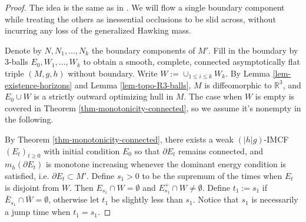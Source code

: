 \documentclass[11pt, letterpaper]{amsart}
\theoremstyle{definition}
\theoremstyle{remark}
\begin{document}
\begin{proof}
	The idea is the same as in \cite[Section 6]{HI01}. We will flow a single boundary component while treating the others as inessential occlusions to be slid across, without incurring any loss of the generalized Hawking mass. 

	Denote by $N, N_1, \ldots, N_{k}$ the boundary components of $M'$. Fill in the boundary by $3$-balls $E_0, W_1, \ldots, W_k$ to obtain a smooth, complete, connected asymptotically flat triple $(M, g, h)$ without boundary. Write $W:= \cup _{1 \leq i \leq k} W_k$. By Lemma \ref{lem-existence-horizons} and Lemma \ref{lem-topo-R3-balls}, $M$ is diffeomorphic to $\mathbb{R}^{3}$, and $E_0 \cup W$ is a strictly outward optimizing hull in $M$. The case when $W$ is empty is covered in Theorem \ref{thm-monotonicity-connected}, so we assume it's nonempty in the following.

	By Theorem \ref{thm-monotonicity-connected}, there exists a weak $(|h|g)$-IMCF $(E_t)_{t \geq 0}$ with initial condition $E_0$ so that $\partial E_t$ remains connected, and $m_h(\partial E_t)$ is monotone increasing whenever the dominant energy condition is satisfied, i.e. $\partial E_t \subset M'$. Define $s_1>0$ to be the supremum of the times when $E_t$ is disjoint from $W$. Then $E_{s_1} \cap W = \emptyset$ and $E_{s_1} ^{+} \cap W \neq \emptyset$. Define $t_1:= s_1$ if $\bar{E}_{s_1} \cap \bar{W} = \emptyset$, otherwise let $t_1$ be slightly less than $s_1$. Notice that $s_1$ is necessarily a jump time when $t_1= s_1$. 


\end{proof}
\end{document}
